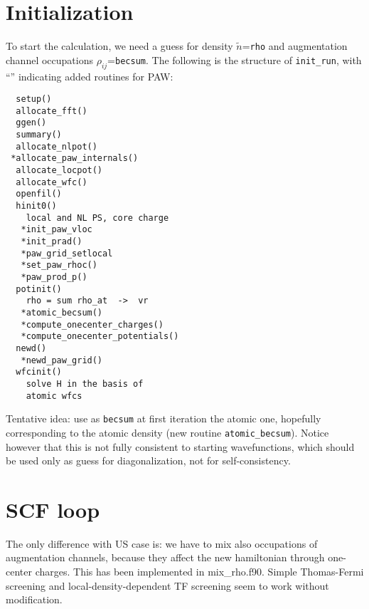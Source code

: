 \documentclass[a4paper,twocolumn,12pt]{article}
\newcommand{\var}[1]{{\tt #1}}
\begin{document}

\section*{Initialization}

To start the calculation, we need a guess for density
$\tilde{n}$=\var{rho} and augmentation channel occupations
$\rho_{ij}$=\var{becsum}.  The following is the structure of
\var{init\_run}, with ``\var{*}'' indicating added routines for PAW:
\begin{verbatim}
  setup()
  allocate_fft()
  ggen()
  summary()
  allocate_nlpot()
 *allocate_paw_internals()
  allocate_locpot()
  allocate_wfc()
  openfil()
  hinit0()
    local and NL PS, core charge
   *init_paw_vloc
   *init_prad()
   *paw_grid_setlocal
   *set_paw_rhoc()
   *paw_prod_p()
  potinit()
    rho = sum rho_at  ->  vr
   *atomic_becsum()
   *compute_onecenter_charges()
   *compute_onecenter_potentials()
  newd()
   *newd_paw_grid()
  wfcinit()
    solve H in the basis of
    atomic wfcs
\end{verbatim}
Tentative idea: use as \var{becsum} at first iteration the atomic one,
hopefully corresponding to the atomic density (new routine
\var{atomic\_becsum}).  Notice however that this is not fully consistent
to starting wavefunctions, which should be used only as guess for
diagonalization, not for self-consistency.

\section*{SCF loop}

The only difference with US case is: we have to mix also occupations
of augmentation channels, because they affect the new hamiltonian
through one-center charges. This has been implemented in 
mix\_rho.f90. Simple Thomas-Fermi screening and local-density-dependent 
TF screening seem to work without modification.
\end{document}
